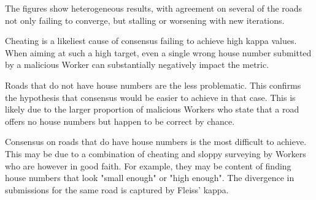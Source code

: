 \begin{figure}[!ht]
    \begin{floatrow}
   \end{floatrow}
\end{figure}
        
The figures show heterogeneous results, with agreement on several of the roads not only failing to converge, but stalling or worsening with new iterations. 

Cheating is a likeliest cause of consensus failing to achieve high kappa values. When aiming at such a high target, even a single wrong house number submitted by a malicious Worker can substantially negatively impact the metric.

Roads that do not have house numbers are the less problematic. This confirms the hypothesis that consensus would be easier to achieve in that case. This is likely due to the larger proportion of malicious Workers who state that a road offers no house numbers but happen to be correct by chance.

Consensus on roads that do have house numbers is the most difficult to achieve. This may be due to a combination of cheating and sloppy surveying by Workers who are however in good faith. For example, they may be content of finding house numbers that look "small enough" or "high enough". The divergence in submissions for the same road is captured by Fleiss' kappa.